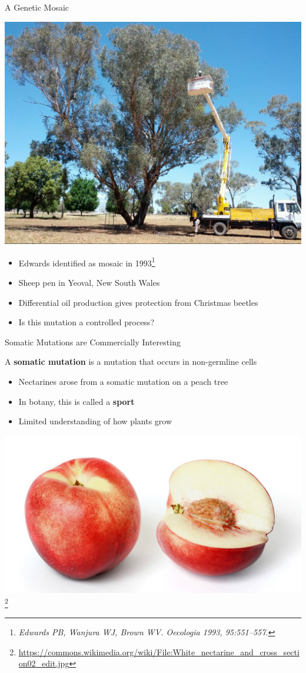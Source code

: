 \documentclass{beamer}
\begin{document}
\begin{frame}{A Genetic Mosaic}
	\begin{center}
	\includegraphics[width=.6\linewidth]{figures/unlabeled_tree.jpg}
	\end{center}
	\begin{itemize}
		\item Edwards identified as mosaic in 1993\footnote{\textit{Edwards PB, Wanjura WJ, Brown WV. Oecologia 1993, 95:551–557.}}
		\item Sheep pen in Yeoval, New South Wales
		\item Differential oil production gives protection from Christmas beetles
		\item Is this mutation a controlled process?
	\end{itemize}
\end{frame}

\begin{frame}{Somatic Mutations are Commercially Interesting}
	\begin{definition}
		A \textbf{somatic mutation} is a mutation that occurs in non-germline cells	
	\end{definition}
	\begin{itemize}
		\item Nectarines arose from a somatic mutation on a peach tree %
		\item In botany, this is called a \textbf{sport}
		\item Limited understanding of how plants grow
	\end{itemize}
	\begin{center}
	\includegraphics[width=.6\linewidth]{figures/nectarine.jpg}
	\footnote{\url{https://commons.wikimedia.org/wiki/File:White_nectarine_and_cross_section02_edit.jpg}}
	\end{center}
\end{frame}
\end{document}
